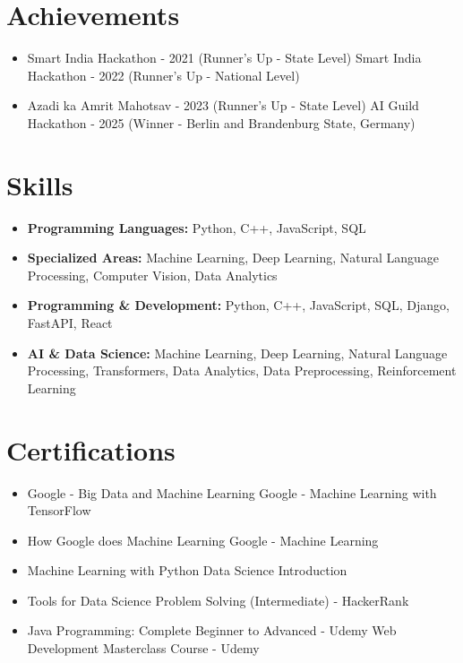 \documentclass[a4paper,10pt]{article}
\begin{document}
\section*{Achievements}
\begin{itemize}
\item Smart India Hackathon - 2021 (Runner's Up - State Level) \hfill Smart India Hackathon - 2022 (Runner's Up - National Level)
\item Azadi ka Amrit Mahotsav - 2023 (Runner's Up - State Level) \hfill AI Guild Hackathon - 2025 (Winner - Berlin and Brandenburg State, Germany)
\end{itemize}

\section*{Skills}
\begin{itemize}
  \item \textbf{Programming Languages:} Python, C++, JavaScript, SQL
  \item \textbf{Specialized Areas:} Machine Learning, Deep Learning, Natural Language Processing, Computer Vision, Data Analytics
  \item \textbf{Programming \& Development:} Python, C++, JavaScript, SQL, Django, FastAPI, React
  \item \textbf{AI \& Data Science:} Machine Learning, Deep Learning, Natural Language Processing, Transformers, Data Analytics, Data Preprocessing, Reinforcement Learning
\end{itemize}

\section*{Certifications}
\begin{itemize}
\item Google - Big Data and Machine Learning \hfill Google - Machine Learning with TensorFlow
\item How Google does Machine Learning \hfill Google - Machine Learning
\item Machine Learning with Python \hfill Data Science Introduction
\item Tools for Data Science \hfill Problem Solving (Intermediate) - HackerRank
\item Java Programming: Complete Beginner to Advanced - Udemy \hfill Web Development Masterclass Course - Udemy
\end{itemize}
\end{document}
